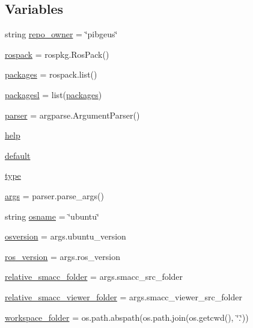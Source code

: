 \subsection*{Variables}
\begin{DoxyCompactItemize}
\item 
string \hyperlink{namespacegenerate__debs_a23479dba5af50c90f3346b04d441ab2b}{repo\+\_\+owner} = \char`\"{}pibgeus\char`\"{}
\item 
\hyperlink{namespacegenerate__debs_a609fa33c1ebbff173ec90524eeb7b49d}{rospack} = rospkg.\+Ros\+Pack()
\item 
\hyperlink{namespacegenerate__debs_a40d4732827c5678f3f48354238245e1d}{packages} = rospack.\+list()
\item 
\hyperlink{namespacegenerate__debs_acac340506bc1d8ca0d0881b9c00bfea2}{packagesl} = list(\hyperlink{namespacegenerate__debs_a40d4732827c5678f3f48354238245e1d}{packages})
\item 
\hyperlink{namespacegenerate__debs_a4a9ae4bb85fc62d7973ea3d09ced6c26}{parser} = argparse.\+Argument\+Parser()
\item 
\hyperlink{namespacegenerate__debs_ab09f4294da5036d5f6881672de9ed9c7}{help}
\item 
\hyperlink{namespacegenerate__debs_a3d67a92b7eb3a59c397dc9fdd1c67558}{default}
\item 
\hyperlink{namespacegenerate__debs_a50bc9a7ecac9584553e089a448bcde58}{type}
\item 
\hyperlink{namespacegenerate__debs_a75f9143e38df82d83b2e8a6f99cae02c}{args} = parser.\+parse\+\_\+args()
\item 
string \hyperlink{namespacegenerate__debs_ad06322332de29cb27a40152d0cccc2ca}{osname} = \char`\"{}ubuntu\char`\"{}
\item 
\hyperlink{namespacegenerate__debs_afd02fe6ead63bc5db5d3c3b9eb973b62}{osversion} = args.\+ubuntu\+\_\+version
\item 
\hyperlink{namespacegenerate__debs_af69f35c2a04a4cc8bd6b9805ab436872}{ros\+\_\+version} = args.\+ros\+\_\+version
\item 
\hyperlink{namespacegenerate__debs_abf6925bd06ac1da3981fe638eefb5a61}{relative\+\_\+smacc\+\_\+folder} = args.\+smacc\+\_\+src\+\_\+folder
\item 
\hyperlink{namespacegenerate__debs_a22d892b78adfce583710d78737eb4747}{relative\+\_\+smacc\+\_\+viewer\+\_\+folder} = args.\+smacc\+\_\+viewer\+\_\+src\+\_\+folder
\item 
\hyperlink{namespacegenerate__debs_acb69863b90257249a30e43ebacfb8bd8}{workspace\+\_\+folder} = os.\+path.\+abspath(os.\+path.\+join(os.\+getcwd(), \char`\"{}.\char`\"{}))

\end{DoxyCompactItemize}
